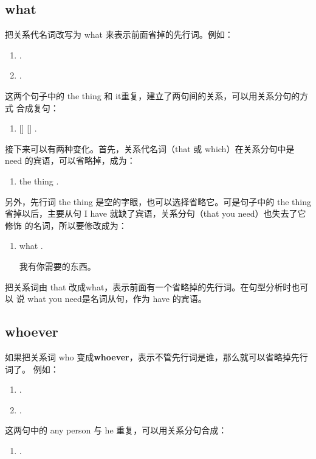 \subsection{what}

把关系代名词改写为 what 来表示前面省掉的先行词。例如：

\begin{enumerate}
\item {}  .
\item {}  .
\end{enumerate}
这两个句子中的 the thing 和 it重复，建立了两句间的关系，可以用关系分句的方式
合成复句：

\begin{enumerate}[resume]
\item {}  []
  []   .
\end{enumerate}

接下来可以有两种变化。首先，关系代名词（that 或 which）在关系分句中是
need 的宾语，可以省略掉，成为：

\begin{enumerate}[resume]
\item {}  the thing  .
\end{enumerate}

另外，先行词 the thing 是空的字眼，也可以选择省略它。可是句子中的 the thing
省掉以后，主要从句 I have 就缺了宾语，关系分句（that you need）也失去了它修饰
的名词，所以要修改成为：

\begin{enumerate}[resume]
\item {}  what  .

  我有你需要的东西。
\end{enumerate}

把关系词由 that 改成what，表示前面有一个省略掉的先行词。在句型分析时也可以
说 what you need是名词从句，作为 have 的宾语。

\subsection{whoever}

如果把关系词 who 变成\textbf{whoever}，表示不管先行词是谁，那么就可以省略掉先行词了。
例如：
\begin{enumerate}
\item {} .
\item {} .
\end{enumerate}
这两句中的 any person 与 he 重复，可以用关系分句合成：
\begin{enumerate}[resume]
\item {} 
   .
\end{enumerate}

